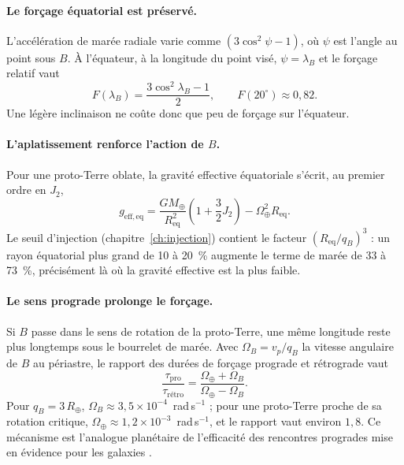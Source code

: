 \documentclass[11pt,a4paper,openany]{report}
\newcommand{\Mt}{M_{\oplus}}
\newcommand{\Rt}{R_{\oplus}}
\newcommand{\Req}{R_{\mathrm{eq}}}
\begin{document}
\paragraph{Le forçage équatorial est préservé.}
L'accélération de marée radiale varie comme $(3\cos^2\psi-1)$, où $\psi$ est l'angle au point
sous $B$. À l'équateur, à la longitude du point visé, $\psi=\lambda_B$ et le forçage relatif vaut
\begin{equation}
F(\lambda_B)=\frac{3\cos^2\lambda_B-1}{2},
\qquad F(20^\circ)\approx0{,}82.
\label{eq:Flambda}
\end{equation}
Une légère inclinaison ne coûte donc que peu de forçage sur l'équateur.

\paragraph{L'aplatissement renforce l'action de \texorpdfstring{$B$}{B}.}
Pour une proto-Terre oblate, la gravité effective équatoriale s'écrit, au premier ordre en $J_2$,
\begin{equation}
g_{\mathrm{eff,eq}}=\frac{G\Mt}{\Req^2}\left(1+\frac32J_2\right)-\Omega_\oplus^2\Req.
\label{eq:geffJ2}
\end{equation}
Le seuil d'injection (chapitre~\ref{ch:injection}) contient le facteur $(\Req/q_B)^3$ : un rayon
équatorial plus grand de 10 à 20~\% augmente le terme de marée de 33 à 73~\%, précisément là
où la gravité effective est la plus faible.

\paragraph{Le sens prograde prolonge le forçage.}
Si $B$ passe dans le sens de rotation de la proto-Terre, une même longitude reste plus longtemps
sous le bourrelet de marée. Avec $\Omega_B=v_p/q_B$ la vitesse angulaire de $B$ au périastre, le
rapport des durées de forçage prograde et rétrograde vaut
\begin{equation}
\frac{\tau_{\mathrm{pro}}}{\tau_{\text{rétro}}}=\frac{\Omega_\oplus+\Omega_B}{\Omega_\oplus-\Omega_B}.
\label{eq:prograde}
\end{equation}
Pour $q_B=3\,\Rt$, $\Omega_B\approx3{,}5\times10^{-4}$~rad\,s$^{-1}$ ; pour une proto-Terre proche de
sa rotation critique, $\Omega_\oplus\approx1{,}2\times10^{-3}$~rad\,s$^{-1}$, et le rapport vaut
environ $1{,}8$. Ce mécanisme est l'analogue planétaire de l'efficacité des rencontres progrades
mise en évidence pour les galaxies \cite{ToomreToomre1972}.
\end{document}
